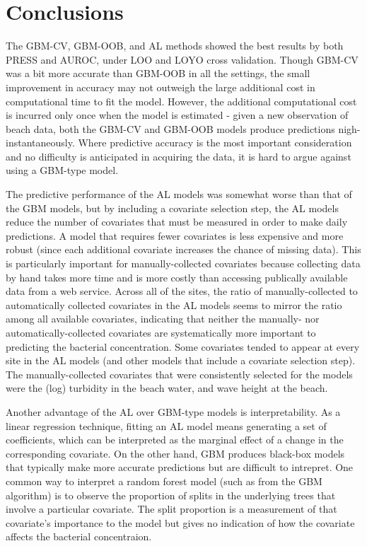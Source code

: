 \documentclass[authoryear,review, 12pt]{elsarticle}
\begin{document}
\section{Conclusions}\label{discussion}

The GBM-CV, GBM-OOB, and AL methods showed the best results by both
PRESS and AUROC, under LOO and LOYO cross validation. Though GBM-CV was
a bit more accurate than GBM-OOB in all the settings, the small
improvement in accuracy may not outweigh the large additional cost in
computational time to fit the model. However, the additional
computational cost is incurred only once when the model is estimated -
given a new observation of beach data, both the GBM-CV and GBM-OOB
models produce predictions nigh-instantaneously. Where predictive
accuracy is the most important consideration and no difficulty is
anticipated in acquiring the data, it is hard to argue against using a
GBM-type model.

The predictive performance of the AL models was somewhat worse than that
of the GBM models, but by including a covariate selection step, the AL
models reduce the number of covariates that must be measured in order to
make daily predictions. A model that requires fewer covariates is less
expensive and more robust (since each additional covariate increases the chance of missing data). This is
particularly important for manually-collected covariates because
collecting data by hand takes more time and is more costly than
accessing publically available data from a web service. Across all of
the sites, the ratio of manually-collected to automatically collected
covariates in the AL models seems to mirror the ratio among all
available covariates, indicating that neither the manually- nor
automatically-collected covariates are systematically more important to
predicting the bacterial concentration. Some covariates tended to appear
at every site in the AL models (and other models that include a
covariate selection step). The manually-collected covariates that were
consistently selected for the models were the (log) turbidity in the
beach water, and wave height at the beach.

Another advantage of the AL over GBM-type models is interpretability. As
a linear regression technique, fitting an AL model means generating a
set of coefficients, which can be interpreted as the marginal effect of
a change in the corresponding covariate. On the other hand, GBM produces
black-box models that typically make more accurate predictions but are
difficult to intrepret. One common way to interpret a random forest
model (such as from the GBM algorithm) is to observe the proportion of
splits in the underlying trees that involve a particular covariate. The
split proportion is a measurement of that covariate's importance to the
model but gives no indication of how the covariate affects the
bacterial concentraion.
\end{document}
